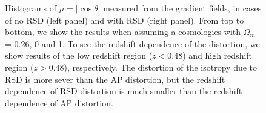 \documentclass{emulateapj}
\begin{document}
\begin{figure}[tpb]
   \caption{\label{fig_muhists} Histograms of $\mu=|\cos\theta|$ measured from the gradient fields, 
   in cases of no RSD (left panel) and with RSD (right panel). 
   From top to bottom, we show the results when assuming a cosmologies with $\Omega_m$ = 0.26, 0 and 1.
   To see the redshift dependence of the distortion, 
   we show results of the low redshift region ($z<0.48$) and high redshift region ($z>0.48$), respectively.
   The distortion of the isotropy due to RSD is more sever than the AP distortion,
   but the redshift dependence of RSD distortion is much smaller than the redshift dependence of AP distortion.}
\end{figure}
\end{document}

